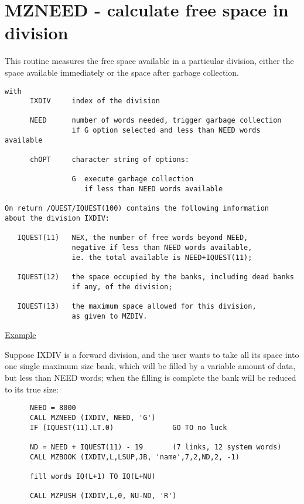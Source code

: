 \section{MZNEED - calculate free space in division}

This routine measures the free space available in a particular
division, either the space available immediately
or the space after garbage collection.


\begin{verbatim}
with
      IXDIV     index of the division

      NEED      number of words needed, trigger garbage collection
                if G option selected and less than NEED words available

      chOPT     character string of options:

                G  execute garbage collection
                   if less than NEED words available

On return /QUEST/IQUEST(100) contains the following information
about the division IXDIV:

   IQUEST(11)   NEX, the number of free words beyond NEED,
                negative if less than NEED words available,
                ie. the total available is NEED+IQUEST(11);

   IQUEST(12)   the space occupied by the banks, including dead banks
                if any, of the division;

   IQUEST(13)   the maximum space allowed for this division,
                as given to MZDIV.
\end{verbatim} 

\ul{Example}

Suppose IXDIV is a forward division, and the user wants to
take all its space into one single maximum size bank,
which will be filled by a variable amount of data, but less
than NEED words; when the filling is complete the bank
will be reduced to its true size:
\begin{verbatim}
      NEED = 8000
      CALL MZNEED (IXDIV, NEED, 'G')
      IF (IQUEST(11).LT.0)              GO TO no luck

      ND = NEED + IQUEST(11) - 19       (7 links, 12 system words)
      CALL MZBOOK (IXDIV,L,LSUP,JB, 'name',7,2,ND,2, -1)

      fill words IQ(L+1) TO IQ(L+NU)

      CALL MZPUSH (IXDIV,L,0, NU-ND, 'R')
\end{verbatim}

